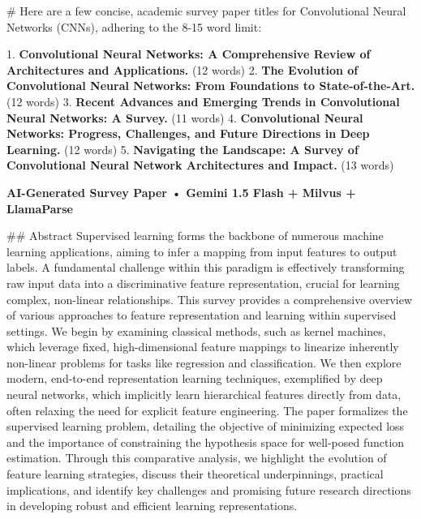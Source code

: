 \documentclass{article}
\begin{document}
\author{Artificial Intelligence}
\date{\today}
\maketitle
\noindent
\twocolumn
\# Here are a few concise, academic survey paper titles for Convolutional Neural Networks (CNNs), adhering to the 8-15 word limit:

1.  \textbf{Convolutional Neural Networks: A Comprehensive Review of Architectures and Applications.} (12 words)
2.  \textbf{The Evolution of Convolutional Neural Networks: From Foundations to State-of-the-Art.} (12 words)
3.  \textbf{Recent Advances and Emerging Trends in Convolutional Neural Networks: A Survey.} (11 words)
4.  \textbf{Convolutional Neural Networks: Progress, Challenges, and Future Directions in Deep Learning.} (12 words)
5.  \textbf{Navigating the Landscape: A Survey of Convolutional Neural Network Architectures and Impact.} (13 words)

\textbf{AI-Generated Survey Paper • Gemini 1.5 Flash + Milvus + LlamaParse}

\#\# Abstract
Supervised learning forms the backbone of numerous machine learning applications, aiming to infer a mapping from input features to output labels. A fundamental challenge within this paradigm is effectively transforming raw input data into a discriminative feature representation, crucial for learning complex, non-linear relationships. This survey provides a comprehensive overview of various approaches to feature representation and learning within supervised settings. We begin by examining classical methods, such as kernel machines, which leverage fixed, high-dimensional feature mappings to linearize inherently non-linear problems for tasks like regression and classification. We then explore modern, end-to-end representation learning techniques, exemplified by deep neural networks, which implicitly learn hierarchical features directly from data, often relaxing the need for explicit feature engineering. The paper formalizes the supervised learning problem, detailing the objective of minimizing expected loss and the importance of constraining the hypothesis space for well-posed function estimation. Through this comparative analysis, we highlight the evolution of feature learning strategies, discuss their theoretical underpinnings, practical implications, and identify key challenges and promising future research directions in developing robust and efficient learning representations.
\end{document}
